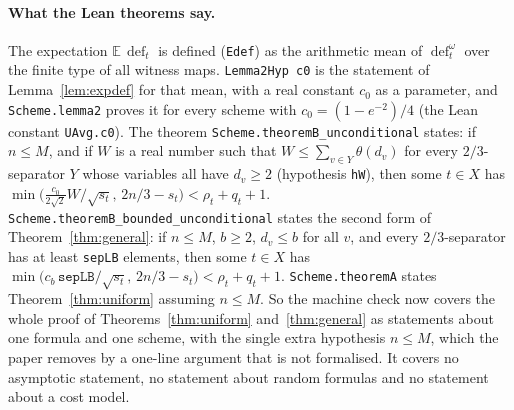 \documentclass[11pt,a4paper]{article}
\theoremstyle{definition}
\theoremstyle{remark}
\newcommand{\E}{\mathbb{E}}
\newcommand{\dfc}{\operatorname{def}}
\begin{document}
\paragraph{What the Lean theorems say.} The expectation $\E\,\dfc_t$ is defined
(\texttt{Edef}) as the arithmetic mean of $\dfc^\omega_t$ over the finite type of all
witness maps. \texttt{Lemma2Hyp c0} is the statement of Lemma~\ref{lem:expdef} for that
mean, with a real constant $c_0$ as a parameter, and \texttt{Scheme.lemma2} proves it for
every scheme with $c_0=(1-e^{-2})/4$ (the Lean constant \texttt{UAvg.c0}). The theorem
\texttt{Scheme.\allowbreak theoremB\_unconditional} states: if $n\le M$, and if $W$ is a real number
such that $W\le\sum_{v\in Y}\theta(d_v)$ for every $2/3$-separator $Y$ whose variables all
have $d_v\ge2$ (hypothesis \texttt{hW}), then some $t\in X$ has
$\min\bigl(\frac{c_0}{2\sqrt2}W/\sqrt{s_t},\,2n/3-s_t\bigr)<\rho_t+q_t+1$.
\texttt{Scheme.theoremB\_bounded\_\allowbreak unconditional} states the second form of
Theorem~\ref{thm:general}: if $n\le M$, $b\ge2$, $d_v\le b$ for all $v$, and every
$2/3$-separator has at least \texttt{sepLB} elements, then some $t\in X$ has
$\min\bigl(c_b\,\texttt{sepLB}/\sqrt{s_t},\,2n/3-s_t\bigr)<\rho_t+q_t+1$.
\texttt{Scheme.theoremA} states Theorem~\ref{thm:uniform} assuming $n\le M$. So the machine
check now covers the whole proof of Theorems~\ref{thm:uniform} and~\ref{thm:general} as
statements about one formula and one scheme, with the single extra hypothesis $n\le M$,
which the paper removes by a one-line argument that is not formalised. It covers no
asymptotic statement, no statement about random formulas and no statement about a cost
model.
\end{document}
